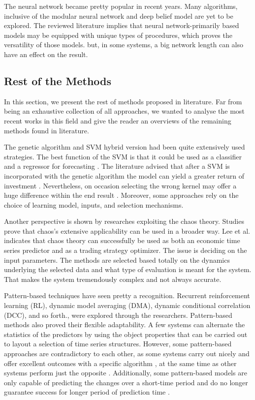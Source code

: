 The neural network became pretty popular in recent years. Many algorithms, inclusive of the modular neural network and deep belief model are yet to be explored. The reviewed literature implies that neural network-primarily based models may be equipped with unique types of procedures, which proves the versatility of those models. but, in some systems, a big network length can also have an effect on the result.

\subsection{Rest of the Methods}
In this section, we present the rest of methods proposed in literature. Far from being an exhaustive collection of all approaches, we wanted to analyse the most recent works in this field and give the reader an overviews of the remaining methods found in literature.

The genetic algorithm and SVM hybrid version had been quite extensively used strategies. The best function of the SVM is that it could be used as a classifier \cite{58} and a regressor for forecasting \cite{59}. The literature advised that after a SVM is incorporated with the genetic algorithm the model can yield a greater return of investment \cite{58}. Nevertheless, on occasion selecting the wrong kernel may offer a huge difference within the end result \cite{59}. Moreover, some approaches rely on the choice of learning model, inputs, and selection mechanisms.

Another perspective is shown by researches exploiting the chaos theory. Studies prove that chaos's extensive applicability can be used in a broader way. Lee et al. \cite{Lee19} indicates that chaos theory can successfully be used as both an economic time series predictor and as a trading strategy optimizer. The issue is deciding on the input parameters. The methods are selected based totally on the dynamics underlying the selected data and what type of evaluation is meant for the system. That makes the system tremendously complex and not always accurate.

Pattern-based techniques have seen pretty a recognition. Recurrent reinforcement learning (RL), dynamic model averaging (DMA), dynamic conditional correlation (DCC), and so forth., were explored through the researchers. Pattern-based methods also proved their flexible adaptability. A few systems can alternate the statistics of the predictors by using the object properties \cite{BARTOS201757} that can be carried out to layout a selection of time series structures. However, some pattern-based approaches are contradictory to each other, as some systems carry out nicely and offer excellent outcomes with a specific algorithm \cite{8376549}, at the same time as other systems perform just the opposite \cite{CONTRERAS20181}. Additionally, some pattern-based models are only capable of predicting the changes over a short-time period and do no longer guarantee success for longer period of prediction time \cite{WILINSKI2019163}.

